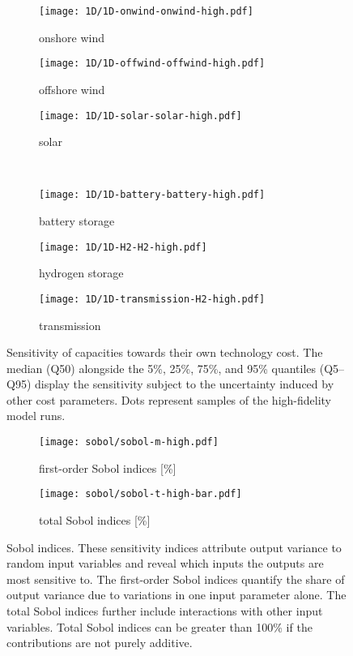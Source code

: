 \begin{figure}
    \begin{subfigure}[t]{0.32\textwidth}
        \caption{onshore wind}
        \texttt{[image: 1D/1D-onwind-onwind-high.pdf]}
    \end{subfigure}
    \begin{subfigure}[t]{0.32\textwidth}
        \caption{offshore wind}
        \texttt{[image: 1D/1D-offwind-offwind-high.pdf]}
    \end{subfigure}
    \begin{subfigure}[t]{0.32\textwidth}
        \caption{solar}
        \texttt{[image: 1D/1D-solar-solar-high.pdf]}
    \end{subfigure} \\
    \begin{subfigure}[t]{0.32\textwidth}
        \caption{battery storage}
        \texttt{[image: 1D/1D-battery-battery-high.pdf]}
    \end{subfigure}
    \begin{subfigure}[t]{0.32\textwidth}
        \caption{hydrogen storage}
        \texttt{[image: 1D/1D-H2-H2-high.pdf]}
    \end{subfigure}
    \begin{subfigure}[t]{0.32\textwidth}
        \caption{transmission}
        \texttt{[image: 1D/1D-transmission-H2-high.pdf]}
    \end{subfigure}
    \vspace{-0.3cm}
    \caption{ Sensitivity of capacities towards their own technology cost. The
      median (Q50) alongside the 5\%, 25\%, 75\%, and 95\% quantiles (Q5--Q95)
      display the sensitivity subject to the uncertainty induced by other cost
      parameters. Dots represent samples of the high-fidelity model runs. }
    \label{fig:sensitivity}
\end{figure}

\begin{figure}
    \begin{subfigure}[t]{0.45\textwidth}
        \caption{first-order Sobol indices [\%]}
        \label{fig:sobol:first}
        \texttt{[image: sobol/sobol-m-high.pdf]}
    \end{subfigure}
    \begin{subfigure}[t]{0.54\textwidth}
        \caption{total Sobol indices [\%]}
        \label{fig:sobol:total}
        \texttt{[image: sobol/sobol-t-high-bar.pdf]}
    \end{subfigure}
    \vspace{-0.3cm}
    \caption[First-order and total Sobol indices]{ Sobol indices. These
      sensitivity indices attribute output variance to random input variables
      and reveal which inputs the outputs are most sensitive to. The first-order
      Sobol indices quantify the share of output variance due to variations in
      one input parameter alone. The total Sobol indices further include
      interactions with other input variables. Total Sobol indices can be
      greater than 100\% if the contributions are not purely additive. }
    \label{fig:sobol}
\end{figure}

